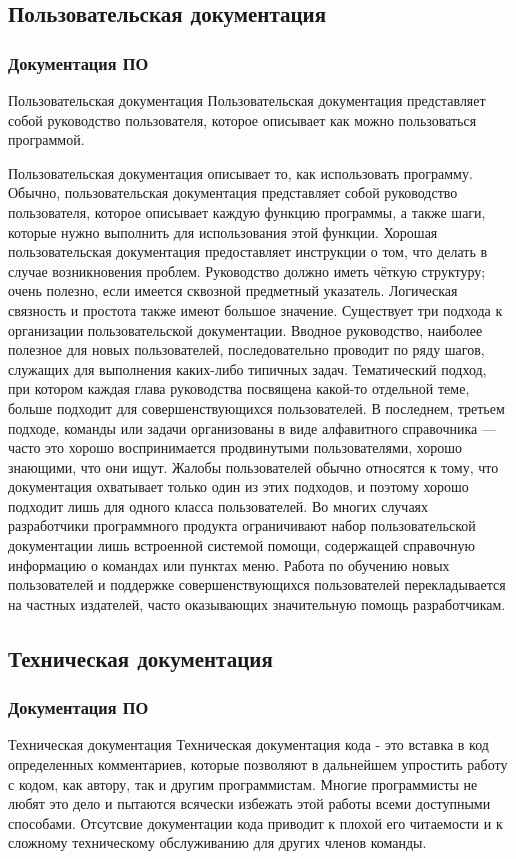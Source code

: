 \documentclass{../industrial-development}
\begin{document}
\subsection{Пользовательская документация}
\begin{frame} \frametitle{Документация ПО}
  \begin{block}{Пользовательская документация}
Пользовательская документация представляет собой руководство пользователя, которое описывает как можно пользоваться программой.
  \end{block}
\end{frame}

\lecturenotes
Пользовательская документация описывает то, как использовать программу.
Обычно, пользовательская документация представляет собой руководство пользователя, которое описывает каждую функцию программы, а также шаги, которые нужно выполнить для использования этой функции. Хорошая пользовательская документация предоставляет инструкции о том, что делать в случае возникновения проблем. Руководство должно иметь чёткую структуру; очень полезно, если имеется сквозной предметный указатель. Логическая связность и простота также имеют большое значение.
Существует три подхода к организации пользовательской документации. Вводное руководство, наиболее полезное для новых пользователей, последовательно проводит по ряду шагов, служащих для выполнения каких-либо типичных задач. Тематический подход, при котором каждая глава руководства посвящена какой-то отдельной теме, больше подходит для совершенствующихся пользователей. В последнем, третьем подходе, команды или задачи организованы в виде алфавитного справочника — часто это хорошо воспринимается продвинутыми пользователями, хорошо знающими, что они ищут. Жалобы пользователей обычно относятся к тому, что документация охватывает только один из этих подходов, и поэтому хорошо подходит лишь для одного класса пользователей.
Во многих случаях разработчики программного продукта ограничивают набор пользовательской документации лишь встроенной системой помощи, содержащей справочную информацию о командах или пунктах меню. Работа по обучению новых пользователей и поддержке совершенствующихся пользователей перекладывается на частных издателей, часто оказывающих значительную помощь разработчикам. 

\subsection{Техническая документация}
\begin{frame} \frametitle{Документация ПО}
  \begin{block}{Техническая документация}
Техническая документация кода - это вставка в код определенных комментариев, которые позволяют в дальнейшем упростить работу с кодом, как автору, так и другим программистам. Многие программисты не любят это дело и пытаются всячески избежать этой работы всеми доступными способами. Отсутсвие документации кода приводит к плохой его читаемости и к сложному техническому обслуживанию для других членов команды.
  \end{block}
\end{frame}
\end{document}
